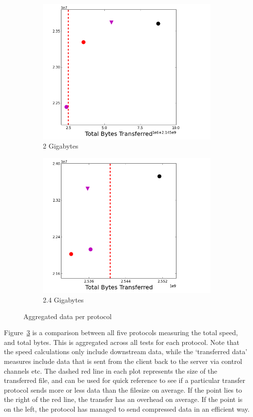 \documentclass{sig-alternate-05-2015}
\begin{document}
\begin{figure}[t]
\begin{subfigure}{.3\linewidth}
	\includegraphics[width=\linewidth]{img/speed_bytes/2G.png}
	\caption{2 Gigabytes}
	\label{speed_bytes_2G}
	\end{subfigure}
	\begin{subfigure}{.3\linewidth}
	\includegraphics[width=\linewidth]{img/speed_bytes/2_4G.png}
	\caption{2.4 Gigabytes}
	\label{speed_bytes_2_4G}
	\end{subfigure}
\caption{Aggregated data per protocol}
\label{fig:aggregate}
\end{figure}

Figure~\ref{fig:aggregate} is a comparison between all five protocols measuring the total speed, and total bytes. This is aggregated across all tests for each protocol. Note that the speed calculations only include downstream data, while the `transferred data' measures include data that is sent from the client back to the server via control channels etc. The dashed red line in each plot represents the size of the transferred file, and can be used for quick reference to see if a particular transfer protocol sends more or less data than the filesize on average. If the point lies to the right of the red line, the transfer has an overhead on average. If the point is on the left, the protocol has managed to send compressed data in an efficient way.
\end{document}
